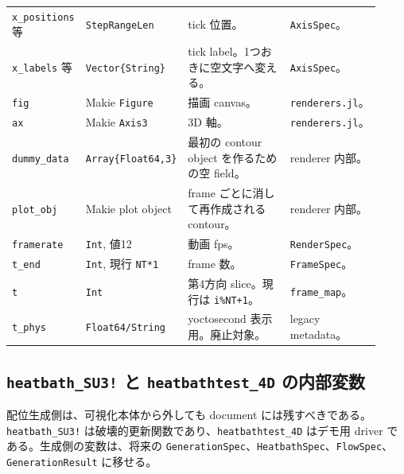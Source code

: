 \documentclass[uplatex,dvipdfmx,ja=standard,11pt,a4paper]{bxjsarticle}
\newcommand{\code}[1]{\texttt{#1}}
\begin{document}
{\begin{longtable}{p{0.20\linewidth}p{0.24\linewidth}p{0.30\linewidth}p{0.18\linewidth}}
\code{x\_positions} 等 & \code{StepRangeLen} & tick 位置。 & \code{AxisSpec}。 \\
\code{x\_labels} 等 & \code{Vector\{String\}} & tick label。1つおきに空文字へ変える。 & \code{AxisSpec}。 \\
\code{fig} & Makie \code{Figure} & 描画 canvas。 & \code{renderers.jl}。 \\
\code{ax} & Makie \code{Axis3} & 3D 軸。 & \code{renderers.jl}。 \\
\code{dummy\_data} & \code{Array\{Float64,3\}} & 最初の contour object を作るための空 field。 & renderer 内部。 \\
\code{plot\_obj} & Makie plot object & frame ごとに消して再作成される contour。 & renderer 内部。 \\
\code{framerate} & \code{Int}, 値12 & 動画 fps。 & \code{RenderSpec}。 \\
\code{t\_end} & \code{Int}, 現行 \code{NT*1} & frame 数。 & \code{FrameSpec}。 \\
\code{t} & \code{Int} & 第4方向 slice。現行は \code{i\%NT+1}。 & \code{frame\_map}。 \\
\code{t\_phys} & \code{Float64/String} & yoctosecond 表示用。廃止対象。 & legacy metadata。 \\
\bottomrule
\end{longtable}
}

\subsection{\texorpdfstring{\code{heatbath\_SU3!}}{heatbath_SU3!} と \texorpdfstring{\code{heatbathtest\_4D}}{heatbathtest_4D} の内部変数}
配位生成側は、可視化本体から外しても document には残すべきである。\code{heatbath\_SU3!} は破壊的更新関数であり、\code{heatbathtest\_4D} はデモ用 driver である。生成側の変数は、将来の \code{GenerationSpec}、\code{HeatbathSpec}、\code{FlowSpec}、\code{GenerationResult} に移せる。
\end{document}
